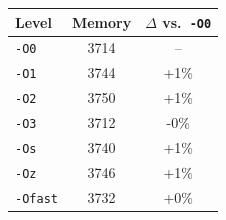 \begin{tabular*}{\columnwidth}{@{\extracolsep\fill}lcc@{\extracolsep\fill}}
\toprule
\textbf{Level} & \textbf{Memory} & \textbf{$\Delta$ vs.\ \texttt{-O0}} \\
\midrule
\texttt{-O0} & 3714 & -- \\
\texttt{-O1} & 3744 & +1\% \\
\texttt{-O2} & 3750 & +1\% \\
\texttt{-O3} & 3712 & -0\% \\
\texttt{-Os} & 3740 & +1\% \\
\texttt{-Oz} & 3746 & +1\% \\
\texttt{-Ofast} & 3732 & +0\% \\
\bottomrule
\end{tabular*}
